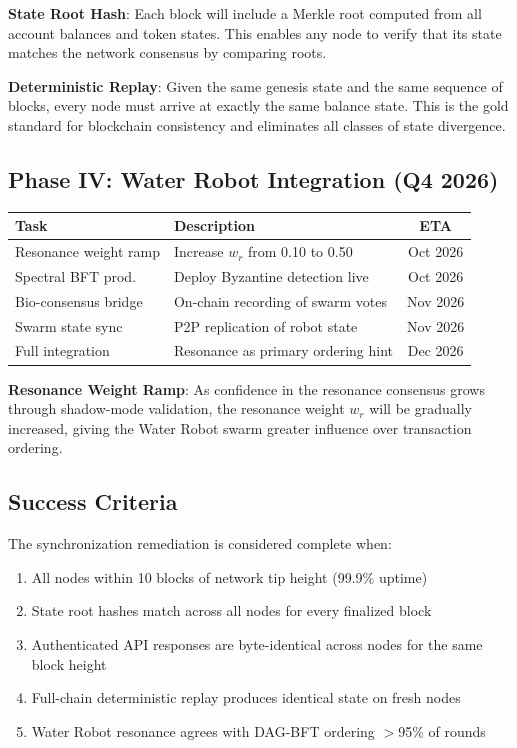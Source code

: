 \documentclass[11pt,a4paper,twocolumn]{article}
\begin{document}
\noindent\textbf{State Root Hash}: Each block will include a Merkle root
computed from all account balances and token states. This enables any node
to verify that its state matches the network consensus by comparing roots.

\noindent\textbf{Deterministic Replay}: Given the same genesis state and
the same sequence of blocks, every node must arrive at exactly the same
balance state. This is the gold standard for blockchain consistency and
eliminates all classes of state divergence.

\subsection{Phase IV: Water Robot Integration (Q4 2026)}

\begin{table}[H]
\centering
\scriptsize
\begin{tabularx}{\columnwidth}{lXc}
\toprule
\textbf{Task} & \textbf{Description} & \textbf{ETA} \\
\midrule
Resonance weight ramp & Increase $w_r$ from 0.10 to 0.50 & Oct 2026 \\
Spectral BFT prod. & Deploy Byzantine detection live & Oct 2026 \\
Bio-consensus bridge & On-chain recording of swarm votes & Nov 2026 \\
Swarm state sync & P2P replication of robot state & Nov 2026 \\
Full integration & Resonance as primary ordering hint & Dec 2026 \\
\bottomrule
\end{tabularx}
\end{table}

\noindent\textbf{Resonance Weight Ramp}: As confidence in the resonance
consensus grows through shadow-mode validation, the resonance weight
$w_r$ will be gradually increased, giving the Water Robot swarm greater
influence over transaction ordering.

\subsection{Success Criteria}

The synchronization remediation is considered complete when:

\begin{enumerate}[nosep,leftmargin=*]
    \item All nodes within 10 blocks of network tip height (99.9\% uptime)
    \item State root hashes match across all nodes for every finalized block
    \item Authenticated API responses are byte-identical across nodes for
          the same block height
    \item Full-chain deterministic replay produces identical state on fresh nodes
    \item Water Robot resonance agrees with DAG-BFT ordering $>$95\% of rounds
\end{enumerate}
\end{document}
